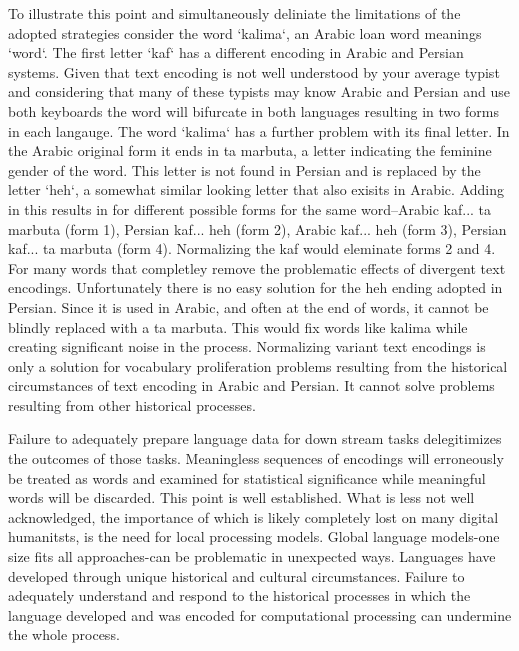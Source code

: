 \documentclass[12pt, oneside]{report}
\begin{document}
\par 
To illustrate this point and simultaneously deliniate the limitations of the adopted strategies consider the word `kalima`, an Arabic loan word meanings `word`. The first letter `kaf` has a different encoding in Arabic and Persian systems. Given that text encoding is not well understood by your average typist and considering that many of these typists may know Arabic and Persian and use both keyboards the word will bifurcate in both languages resulting in two forms in each langauge. The word `kalima` has a further problem with its final letter. In the Arabic original form it ends in ta marbuta, a letter indicating the feminine gender of the word. This letter is not found in Persian and is replaced by the letter `heh`, a somewhat similar looking letter that also exisits in Arabic. Adding in this results in for different possible forms for the same word–Arabic kaf... ta marbuta (form 1), Persian kaf... heh (form 2), Arabic kaf... heh (form 3), Persian kaf... ta marbuta (form 4). Normalizing the kaf would eleminate forms 2 and 4. For many words that completley remove the problematic effects of divergent text encodings. Unfortunately there is no easy solution for the heh ending adopted in Persian. Since it is used in Arabic, and often at the end of words, it cannot be blindly replaced with a ta marbuta. This would fix words like kalima while creating significant noise in the process. Normalizing variant text encodings is only a solution for vocabulary proliferation problems resulting from the historical circumstances of text encoding in Arabic and Persian. It cannot solve problems resulting from other historical processes.
\par 
Failure to adequately prepare language data for down stream tasks delegitimizes the outcomes of those tasks. Meaningless sequences of encodings will erroneously be treated as words and examined for statistical significance while meaningful words will be discarded. This point is well established. What is less not well acknowledged, the importance of which is likely completely lost on many digital humanitsts, is the need for local processing models. Global language models-one size fits all approaches-can be problematic in unexpected ways. Languages have developed through unique historical and cultural circumstances. Failure to adequately understand and respond to the historical processes in which the language developed and was encoded for computational processing can undermine the whole process.
\end{document}
